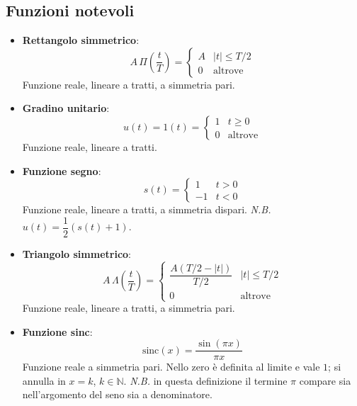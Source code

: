 \documentclass[12pt, a4paper]{article}
\begin{document}
\subsection{Funzioni notevoli}
\begin{itemize}
    \item \textbf{\textcolor{orange!80!black}{Rettangolo simmetrico}}:
    $$A\,\Pi\left(\frac{t}{T}\right) = \begin{cases} A & |t| \le T/2 \\ 0 & \text{altrove}\end{cases}$$
    Funzione reale, lineare a tratti, a simmetria pari.
    \item \textbf{\textcolor{orange!80!black}{Gradino unitario}}:
    $$u(t) = 1(t) = \begin{cases} 1 & t \ge 0 \\ 0 & \text{altrove}\end{cases}$$
    Funzione reale, lineare a tratti.
    \item \textbf{\textcolor{orange!80!black}{Funzione segno}}:
    $$s(t) = \begin{cases} 1 & t > 0 \\ -1 & t < 0\end{cases}$$
    Funzione reale, lineare a tratti, a simmetria dispari. \textit{N.B.} $u(t) = \dfrac{1}{2}(s(t)+1)$.
    \item \textbf{\textcolor{orange!80!black}{Triangolo simmetrico}}:
    $$A\,\Lambda\left(\frac{t}{T}\right) = \begin{cases} \dfrac{A(T/2-|t|)}{T/2} & |t|\le T/2 \\ 0 & \text{altrove}\end{cases}$$
    Funzione reale, lineare a tratti, a simmetria pari.
    \item \textbf{\textcolor{orange!80!black}{Funzione sinc}}:
    $$\text{sinc}(x) = \frac{\sin(\pi x)}{\pi x}$$
    Funzione reale a simmetria pari. Nello zero è definita al limite e vale $1$; si annulla in $x=k$, $k\in\mathbb{N}$. \textit{N.B.} in questa definizione il termine $\pi$ compare sia nell'argomento del seno sia a denominatore.
\end{itemize}
\end{document}
